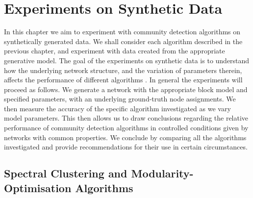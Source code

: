 
\chapter{Experiments on Synthetic Data}

\label{cha:experimentsOnSyntheticData}


In this chapter we aim to experiment with community detection algorithms on synthetically generated data.
We shall consider each algorithm described in the previous chapter, and experiment with data created from the appropriate generative model.
The goal of the experiments on synthetic data is to understand how the underlying
network structure, and the variation of parameters therein, affects the performance of different algorithms \cite{RLK12}.
In general the experiments will proceed as follows.
We generate a network with the appropriate block model and specified parameters, with an underlying ground-truth node assignments.
We then measure the accuracy of the specific algorithm investigated as we vary model parameters.
This then allows us to draw conclusions regarding the relative performance of community detection algorithms in controlled conditions given by networks with common properties.
We conclude by comparing all the algorithms investigated and provide recommendations for their use in certain circumstances.


\section{Spectral Clustering and Modularity-Optimisation Algorithms}
\label{sec:spectralClusteringModularityOptimisationAlgorithms}

